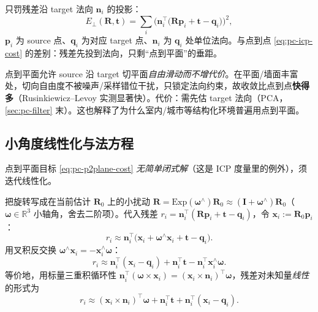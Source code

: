 \begin{definition}[点到平面误差度量]\label{def:pc-p2plane}
只罚残差沿 target 法向 $\mathbf{n}_i$ 的投影：
\begin{equation}
  E_{\perp}(\mathbf{R},\mathbf{t})=\sum_i\Big(\mathbf{n}_i^\top\big(\mathbf{R}\mathbf{p}_i+\mathbf{t}-\mathbf{q}_i\big)\Big)^2,
  \label{eq:pc-p2plane-cost}
\end{equation}
$\mathbf{p}_i$ 为 source 点、$\mathbf{q}_i$ 为对应 target 点、$\mathbf{n}_i$ 为 $\mathbf{q}_i$ 处单位法向。与点到点 \cref{eq:pc-icp-cost} 的差别：残差先投到法向，只剩“点到平面”的垂距。
\end{definition}

\begin{insight}
点到平面允许 source 沿 target 切平面\emph{自由滑动而不增代价}。在平面/墙面丰富处，切向自由度不被噪声/采样错位干扰，只锁定法向约束，故收敛比点到点\textbf{快得多}（Rusinkiewicz--Levoy 实测显著快）。代价：需先估 target 法向（PCA，\cref{sec:pc-filter} 末）。这也解释了为什么室内/城市等结构化环境普遍用点到平面。
\end{insight}

\subsection{小角度线性化与法方程}
\label{sec:pc-p2plane-lin}

点到平面目标 \cref{eq:pc-p2plane-cost} \emph{无简单闭式解}（这是 ICP 度量里的例外），须迭代线性化\cite{low2004p2plane}。

\begin{derivation}
把旋转写成在当前估计 $\mathbf{R}_0$ 上的小扰动 $\mathbf{R}=\mathrm{Exp}(\boldsymbol{\omega}^\wedge)\mathbf{R}_0\approx(\mathbf{I}+\boldsymbol{\omega}^\wedge)\mathbf{R}_0$（$\boldsymbol{\omega}\in\mathbb{R}^3$ 小轴角，舍去二阶项）。代入残差 $r_i=\mathbf{n}_i^\top(\mathbf{R}\mathbf{p}_i+\mathbf{t}-\mathbf{q}_i)$，令 $\mathbf{x}_i:=\mathbf{R}_0\mathbf{p}_i$：
\begin{equation}
  r_i\approx\mathbf{n}_i^\top\big(\mathbf{x}_i+\boldsymbol{\omega}^\wedge\mathbf{x}_i+\mathbf{t}-\mathbf{q}_i\big).
\end{equation}
用叉积反交换 $\boldsymbol{\omega}^\wedge\mathbf{x}_i=-\mathbf{x}_i^\wedge\boldsymbol{\omega}$：
\begin{equation}
  r_i\approx\mathbf{n}_i^\top(\mathbf{x}_i-\mathbf{q}_i)+\mathbf{n}_i^\top\mathbf{t}-\mathbf{n}_i^\top\mathbf{x}_i^\wedge\boldsymbol{\omega}.
  \label{eq:pc-p2plane-r}
\end{equation}
等价地，用标量三重积循环性 $\mathbf{n}_i^\top(\boldsymbol{\omega}\times\mathbf{x}_i)=(\mathbf{x}_i\times\mathbf{n}_i)^\top\boldsymbol{\omega}$，残差对未知量\emph{线性}的形式为
\begin{equation}
  r_i\approx(\mathbf{x}_i\times\mathbf{n}_i)^\top\boldsymbol{\omega}+\mathbf{n}_i^\top\mathbf{t}+\mathbf{n}_i^\top(\mathbf{x}_i-\mathbf{q}_i).
  \label{eq:pc-p2plane-rlin}
\end{equation}
\end{derivation}

